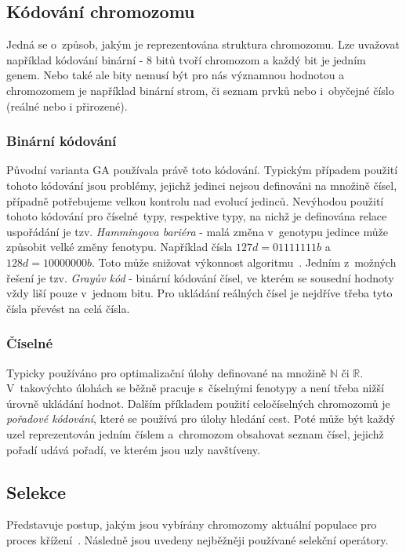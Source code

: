 \subsection{Kódování chromozomu}
Jedná se o~způsob, jakým je reprezentována struktura chromozomu. Lze uvažovat například kódování binární - 8 bitů tvoří chromozom a každý bit je jedním genem. Nebo také ale bity nemusí být pro nás významnou hodnotou a chromozomem je například binární strom, či seznam prvků nebo i~obyčejné číslo (reálné nebo i přirozené). 

\subsubsection*{Binární kódování}
Původní varianta GA používala právě toto kódování. Typickým případem použití tohoto kódování jsou problémy, jejichž jedinci nejsou definováni na množině čísel, případně potřebujeme velkou kontrolu nad evolucí jedinců. Nevýhodou použití tohoto kódování pro číselné~typy, respektive typy, na nichž je definována relace uspořádání je tzv. \textit{Hammingova bariéra} - malá změna v~genotypu jedince může způsobit velké změny fenotypu. Například čísla $127d = 01111111b$ a $128d = 10000000b$. Toto může snižovat výkonnost algoritmu~\cite{Weisser2010}. Jedním z~možných řešení je tzv. \textit{Grayův kód} - binární kódování čísel, ve kterém se sousední hodnoty vždy liší pouze v~jednom bitu. Pro ukládání reálných čísel je nejdříve třeba tyto čísla převést na celá čísla. 

\subsubsection*{Číselné}
Typicky používáno pro optimalizační úlohy definované na množině $\mathbb{N}$ či $\mathbb{R}$. V~takovýchto úlohách se běžně pracuje s~číselnými fenotypy a není třeba nižší úrovně ukládání hodnot. Dalším příkladem použití celočíselných chromozomů je \textit{pořadové kódování}, které se používá pro úlohy hledání cest. Poté může být každý uzel reprezentován jedním číslem a~chromozom obsahovat seznam čísel, jejichž pořadí udává pořadí, ve kterém jsou uzly navštíveny.


\subsection{Selekce}
Představuje postup, jakým jsou vybírány chromozomy aktuální populace pro proces křížení~\cite{EVO, Weisser2010}. Následně jsou uvedeny nejběžněji používané selekční operátory.

